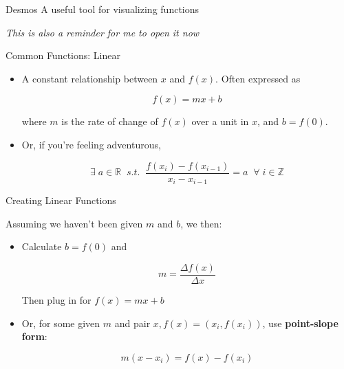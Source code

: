 \documentclass[10pt]{beamer}
\begin{document}
\begin{frame}{Desmos}
    A useful tool for visualizing functions\\

    \vspace{3cm}

    \begin{footnotesize}
        \textit{This is also a reminder for me to open it now}
    \end{footnotesize}
\end{frame}

\begin{frame}{Common Functions: Linear}

\begin{itemize}
    \item A constant relationship between $x$ and $f(x)$. Often expressed as 

    \[f(x) = mx + b\]

    where $m$ is the rate of change of $f(x)$ over a unit in $x$, and $b = f(0)$. \pause

    \item Or, if you're feeling adventurous,

    \[\exists \;a \in \mathbb{R} \; \;s.t.\; \;\frac{f(x_{i}) - f(x_{i-1})}{x_i - x_{i-1}} = a \;\;\forall \;i \in \mathbb{Z}\]
\end{itemize}

\end{frame}

\begin{frame}{Creating Linear Functions}

Assuming we haven't been given $m$ and $b$, we then:

\begin{itemize}
    \item Calculate $b = f(0)$ and

    \[m = \frac{\Delta f(x)}{\Delta x}\]

    Then plug in for $f(x) = mx+b$

    \item Or, for some given $m$ and pair $x,f(x) = (x_i, f(x_i))$, use \textbf{point-slope form}:

    \[m(x-x_i) = f(x) - f(x_i) \]

\end{itemize}

\end{frame}
\end{document}
